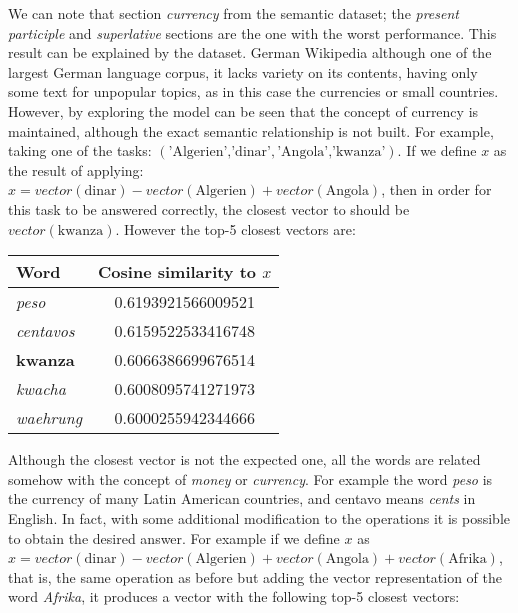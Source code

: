 We can note that section  \textit{currency} from
the semantic dataset; the \textit{present participle}  and 
\textit{superlative}  sections are the one with the  worst performance. This
result can be explained by the dataset. German Wikipedia although one of the
largest German language corpus, it lacks variety on its contents, having only
some text for unpopular topics, as in this case the currencies or small
countries. However, by exploring the model  can be seen that the concept of currency is maintained, although
the exact semantic relationship is not built.  For example, taking one of the
tasks:  $(\text{'Algerien','dinar'},\text{'Angola','kwanza'})$. If we define
$x$ as the result of applying:  $x = vector(\text{dinar}) -
vector(\text{Algerien}) + vector(\text{Angola})$, then in order for this task
to be answered correctly, the closest vector to should be $vector(\text{kwanza})$.
However the top-5 closest vectors are:


\begin{center}
\small
\begin{tabular}{|l|c|}
 \hline
 Word             &  Cosine similarity to $x$  \\
\hline
 \textit{peso}           &      0.6193921566009521  \\
 \textit{centavos}       &      0.6159522533416748  \\
 \textbf{kwanza}         &      0.6066386699676514  \\
 \textit{kwacha}         &      0.6008095741271973  \\
 \textit{waehrung}       &      0.6000255942344666  \\
\hline
\end{tabular}
\end{center}


Although the closest vector is not the expected one, all the words are related
somehow with the concept of \textit{money} or \textit{currency}.  For example
the word \textit{peso} is the currency of many Latin American countries, and
centavo means \textit{cents} in English. In
fact,  with some additional modification  to the operations it is
possible to obtain the desired answer. For example if we define $x$ as  $x = vector(\text{dinar}) -
vector(\text{Algerien}) + vector(\text{Angola})  + vector(\text{Afrika}) $,
that is, the same operation as before but adding the vector representation of
the word \textit{Afrika}, it produces a vector with the following top-5 closest
vectors:


